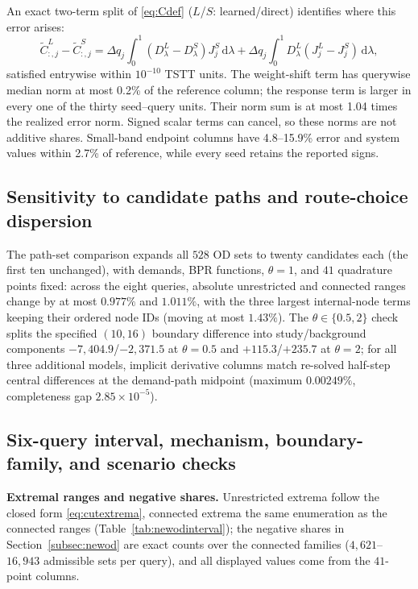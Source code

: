 An exact two-term split of \eqref{eq:Cdef} ($L$/$S$: learned/direct)
identifies where this error arises:
\begin{equation}
\widetilde C_{:,j}^{L}-\widetilde C_{:,j}^{S}
=\Delta q_j\int_0^1(D_\lambda^{L}-D_\lambda^{S})J_j^{S}\,\mathrm{d}\lambda
+\Delta q_j\int_0^1D_\lambda^{L}(J_j^{L}-J_j^{S})\,\mathrm{d}\lambda,
\label{eq:coldecomp}
\end{equation}
satisfied entrywise within $10^{-10}$ TSTT units. The weight-shift
term has querywise median norm at most 0.2\% of the reference column;
the response term is larger in every one of the thirty seed--query
units. Their norm sum is at most 1.04 times the realized error norm.
Signed scalar terms can cancel, so these norms are not additive shares.
Small-band endpoint columns have 4.8--15.9\% error and system values
within 2.7\% of reference, while every seed retains the reported signs.

\subsection{Sensitivity to candidate paths and route-choice dispersion}\label{supp:coverage}
The path-set comparison expands all $528$ OD sets to twenty
candidates each (the first ten unchanged), with demands, BPR
functions, $\theta=1$, and $41$ quadrature points fixed: across the
eight queries, absolute unrestricted and connected ranges change by
at most $0.977\%$ and $1.011\%$, with the three largest
internal-node terms keeping their ordered node IDs (moving at most
$1.43\%$). The $\theta\in\{0.5,2\}$ check splits the specified
$(10,16)$ boundary difference into study/background components
$-7{,}404.9$/$-2{,}371.5$ at $\theta=0.5$ and $+115.3$/$+235.7$ at
$\theta=2$; for all three additional models, implicit derivative
columns match re-solved half-step central differences at the
demand-path midpoint (maximum $0.00249\%$, completeness gap
$2.85\times10^{-5}$).

\subsection{Six-query interval, mechanism, boundary-family, and
scenario checks}\label{supp:newodaccuracy}


\textbf{Extremal ranges and negative shares.}
Unrestricted extrema follow the closed form \eqref{eq:cutextrema},
connected extrema the same enumeration as the connected ranges
(Table~\ref{tab:newodinterval}); the negative shares in
Section~\ref{subsec:newod} are exact counts over the connected
families ($4{,}621$--$16{,}943$ admissible sets per query), and all
displayed values come from the $41$-point columns.

